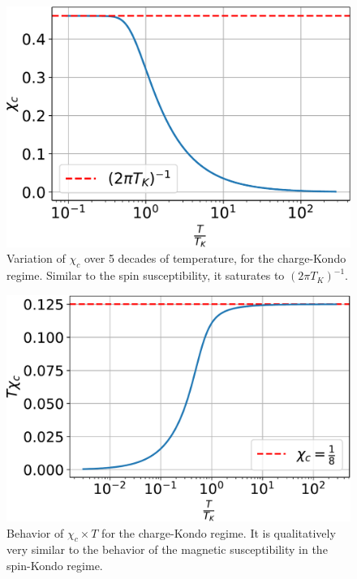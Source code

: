 \documentclass[twoside]{report}
\numberwithin{equation}{section}
\begin{document}
\begin{figure}[htpb]
	\centering
	\includegraphics[height=0.27\textheight]{../figures/chi_c_new.pdf}
	\caption{Variation of \(\chi_c\) over 5 decades of temperature, for the charge-Kondo regime. Similar to the spin susceptibility, it saturates to \(\left( 2\pi T_K \right)^{-1}\).}
	\label{charge_sus}
\end{figure}
\begin{figure}[htpb]
	\centering
	\includegraphics[height=0.27\textheight]{../figures/T_chi_c_new.pdf}
	\caption{Behavior of \(\chi_c\times T\) for the charge-Kondo regime. It is qualitatively very similar to the behavior of the magnetic susceptibility in the spin-Kondo regime.}
	\label{chcT}
\end{figure}
\end{document}

